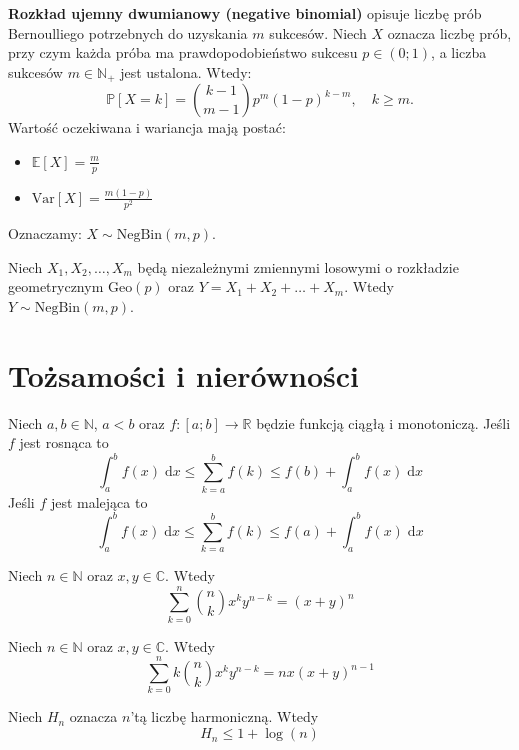 \begin{definition}
\textbf{Rozkład ujemny dwumianowy (negative binomial)} opisuje liczbę prób Bernoulliego potrzebnych do uzyskania $m$ sukcesów.  
Niech $X$ oznacza liczbę prób, przy czym każda próba ma prawdopodobieństwo sukcesu $p \in (0;1)$, a liczba sukcesów $m \in \mathbb{N}_+$ jest ustalona.  
Wtedy:
\[
\mathbb{P}[X = k] = \binom{k-1}{m-1} p^m (1 - p)^{k - m}, \quad k \ge m.
\]
Wartość oczekiwana i wariancja mają postać:
\begin{itemize}
    \item $\mathbb{E}[X] = \frac{m}{p}$
    \item $\mathrm{Var}[X] = \frac{m(1 - p)}{p^2}$
\end{itemize} 
Oznaczamy: $X \sim \mathrm{NegBin}(m, p)$.
\end{definition}

\begin{fact}\label{F:sum_of_geo_RV}
Niech $X_1, X_2, \dots, X_m$ będą niezależnymi zmiennymi losowymi o rozkładzie geometrycznym $\mathrm{Geo}(p)$ oraz $Y=X_1 + X_2 + \dots + X_m$. Wtedy $Y \sim \mathrm{NegBin}(m, p)$.
\end{fact}


\section{Tożsamości i nierówności}

\begin{fact}\label{F:approximation_of_sum_by_an_integral}
Niech $a,b\in\mathbb{N}$, $a<b$ oraz $f:[a;b]\to\mathbb{R}$ będzie funkcją ciągłą i monotoniczą.
Jeśli $f$ jest rosnąca to
\[
    \int_{a}^b f(x)\; \mathrm{d}x \le \sum_{k=a}^{b} f(k)\le f(b) + \int_{a}^b f(x)\; \mathrm{d}x
\]
Jeśli $f$ jest malejąca to 
\[
    \int_{a}^b f(x)\; \mathrm{d}x \le \sum_{k=a}^{b} f(k)\le f(a) + \int_{a}^b f(x)\; \mathrm{d}x
\]
\end{fact}

\begin{fact}\label{F:binomial}
Niech $n\in\mathbb{N}$ oraz $x,y\in\mathbb{C}$. Wtedy
\[
    \sum_{k=0}^{n} \binom{n}{k} x^k y^{n-k}= (x+y)^n
\]
\end{fact}

\begin{fact}\label{F:binomial1}
Niech $n\in\mathbb{N}$ oraz $x,y\in\mathbb{C}$. Wtedy
\[
    \sum_{k=0}^{n} k\binom{n}{k} x^k y^{n-k} = nx(x+y)^{n-1}
\]
\end{fact}

\begin{fact}\label{F:harmonic_upper_bound}
Niech $H_n$ oznacza $n$'tą liczbę harmoniczną. Wtedy
\[
    H_n \le 1 + \log(n)
\]
\end{fact}


